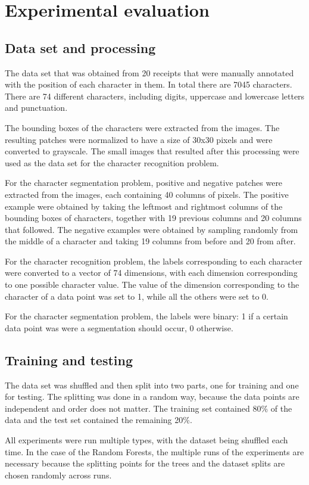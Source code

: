 \section{Experimental evaluation}
\subsection{Data set and processing}
The data set that was obtained from 20 receipts that were manually annotated with the position of each character in them. In total there are 7045 characters. There are 74 different characters, including digits, uppercase and lowercase letters and punctuation. 

The bounding boxes of the characters were extracted from the images. The resulting patches were normalized to have a size of 30x30 pixels and were converted to grayscale. The small images that resulted after this processing were used as the data set for the character recognition problem.

For the character segmentation problem, positive and negative patches were extracted from the images, each containing 40 columns of pixels. The positive example were obtained by taking the leftmost and rightmost columns of the bounding boxes of characters, together with 19 previous columns and 20 columns that followed. The negative examples were obtained by sampling randomly from the middle of a character and taking 19 columns from before and 20 from after.

For the character recognition problem, the labels corresponding to each character were converted to a vector of 74 dimensions, with each dimension corresponding to one possible character value. The value of the dimension corresponding to the character of a data point was set to 1, while all the others were set to 0. 

For the character segmentation problem, the labels were binary: 1 if a certain data point was were a segmentation should occur, 0 otherwise. 

\subsection{Training and testing}
The data set was shuffled and then split into two parts, one for training and one for testing. The splitting was done in a random way, because the data points are independent and order does not matter. The training set contained 80\% of the data and the test set contained the remaining 20\%. 

All experiments were run multiple types, with the dataset being shuffled each time. In the case of the Random Forests, the multiple runs of the experiments are necessary because the splitting points for the trees and the dataset splits are chosen randomly across runs. 
